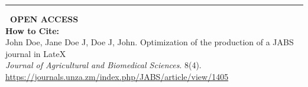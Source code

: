 \documentclass[11pt]{extarticle}
\begin{document}
\thispagestyle{titlepagestyle}


\vspace*{0.5cm} %

\begin{minipage}{\textwidth}
  \noindent

  \vspace{0.5em}
  {\color{jabsgreen}\rule{\textwidth}{2pt}}
  \vspace{1.5em}

  \noindent
  \begin{minipage}[t]{0.35\textwidth}
    \begin{leftinfobox}
      \small
      \faUnlock \textbf{~OPEN ACCESS} \\[0.75em]

      \textbf{How to Cite:} \\
      John Doe, Jane Doe J, Doe J, John. Optimization of the production of a JABS journal in LateX \\
      \textit{Journal of Agricultural and Biomedical Sciences}. 8(4). \\
      \url{https://journals.unza.zm/index.php/JABS/article/view/1405} \\[1em]


\end{leftinfobox}
\end{minipage}
\end{minipage}
\end{document}
